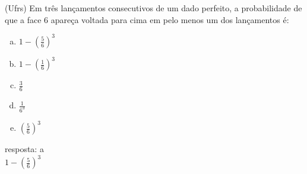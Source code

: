 \begin{ex}
(Ufrs) Em três lançamentos consecutivos de um dado perfeito,  a probabilidade de que a face 6 apareça voltada para cima em pelo menos um dos lançamentos é:
   \begin{enumerate}[(a)]
   \item $1-(\frac{5}{6})^3$
   \item $1-(\frac{1}{6})^3$
   \item $\frac{3}{6}$
   \item $\frac{1}{6^3}$
   \item $(\frac{5}{6})^3$
   \end{enumerate}
     \begin{sol}
        resposta: a \\
        $1-(\frac{5}{6})^3$
     \end{sol}
\end{ex}